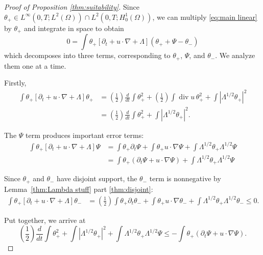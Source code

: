 \documentclass[11pt]{amsart}
\theoremstyle{remark}
\theoremstyle{definition}
\newcommand{\paren}[1]{\left( #1 \right)}
\newcommand{\bracket}[1]{\left[ #1 \right]}
\newcommand{\abs}[1]{\left\lvert #1 \right\rvert}
\newcommand{\del}{\partial}
\newcommand{\grad}{\nabla}
\newcommand{\ddt}{\frac{d}{dt}}
\renewcommand{\div}{\operatorname{div}}
\begin{document}
\begin{proof}[Proof of Proposition \ref{thm:suitability}]
Since $\theta_+ \in L^\infty(0,T; L^2(\Omega)) \cap L^2(0,T; H_0^1(\Omega))$, we can multiply \eqref{eq:main linear} by $\theta_+$ and integrate in space to obtain
\[ 0 = \int \theta_+ \bracket{ \del_t + u \cdot \grad + \Lambda } \paren{\theta_+ + \Psi - \theta_-} \]
which decomposes into three terms, corresponding to $\theta_+$, $\Psi$, and $\theta_-$.  We analyze them one at a time.  

Firstly,
\begin{align*} 
\int \theta_+ \bracket{ \del_t + u \cdot \grad + \Lambda } \theta_+ &= \paren{\frac{1}{2}} \ddt \int \theta_+^2 + \paren{\frac{1}{2}} \int \div u \, \theta_+^2 + \int \abs{\Lambda^{1/2} \theta_+}^2
\\ &= \paren{\frac{1}{2}} \ddt \int \theta_+^2 + \int \abs{\Lambda^{1/2} \theta_+}^2.
\end{align*}

The $\Psi$ term produces important error terms:
\begin{align*} 
\int \theta_+ \bracket{ \del_t + u \cdot \grad + \Lambda } \Psi &= \int \theta_+ \del_t \Psi + \int \theta_+ u \cdot \grad \Psi + \int \Lambda^{1/2} \theta_+ \Lambda^{1/2} \Psi
\\ &= \int \theta_+ (\del_t \Psi + u \cdot \grad \Psi) + \int \Lambda^{1/2} \theta_+ \Lambda^{1/2} \Psi
\end{align*}

Since $\theta_+$ and $\theta_-$ have disjoint support, the $\theta_-$ term is nonnegative by Lemma~\ref{thm:Lambda stuff} part \eqref{thm:disjoint}:
\begin{align*} 
\int \theta_+ \bracket{ \del_t + u \cdot \grad + \Lambda } \theta_- &= \paren{\frac{1}{2}} \int \theta_+ \del_t \theta_- + \int \theta_+ u \cdot \grad \theta_- + \int \Lambda^{1/2} \theta_+ \Lambda^{1/2} \theta_-
\leq 0.
\end{align*}

Put together, we arrive at 
\begin{equation} \label{first form of cacciopolli} \paren{\frac{1}{2}} \ddt \int \theta_+^2 + \int \abs{\Lambda^{1/2} \theta_+}^2 + \int \Lambda^{1/2} \theta_+ \Lambda^{1/2} \Psi \leq -\int \theta_+ (\del_t \Psi + u \cdot \grad \Psi). \end{equation}


\end{proof}
\end{document}
